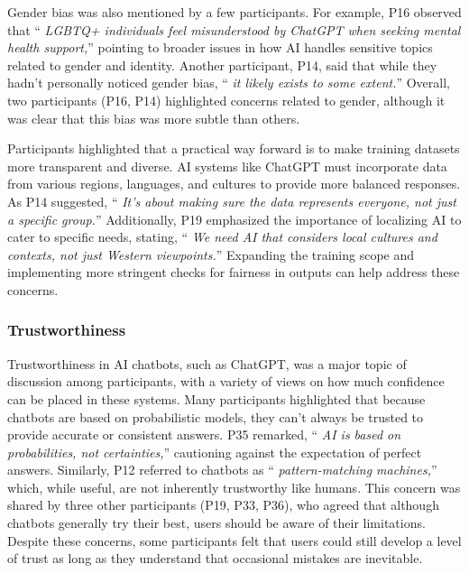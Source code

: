 \documentclass[sigconf]{acmart}
\begin{document}
Gender bias was also mentioned by a few participants. For example, P16 observed that \enquote { \emph {LGBTQ+ individuals feel misunderstood by ChatGPT when seeking mental health support,}} pointing to broader issues in how AI handles sensitive topics related to gender and identity. Another participant, P14, said that while they hadn’t personally noticed gender bias, \enquote { \emph {it likely exists to some extent.}} Overall, two participants (P16, P14) highlighted concerns related to gender, although it was clear that this bias was more subtle than others.

Participants highlighted that a practical way forward is to make training datasets more transparent and diverse. AI systems like ChatGPT must incorporate data from various regions, languages, and cultures to provide more balanced responses. As P14 suggested, \enquote { \emph {It’s about making sure the data represents everyone, not just a specific group.}} Additionally, P19 emphasized the importance of localizing AI to cater to specific needs, stating, \enquote { \emph {We need AI that considers local cultures and contexts, not just Western viewpoints.}} Expanding the training scope and implementing more stringent checks for fairness in outputs can help address these concerns.


\subsubsection{Trustworthiness}
\hfill \break

Trustworthiness in AI chatbots, such as ChatGPT, was a major topic of discussion among participants, with a variety of views on how much confidence can be placed in these systems. Many participants highlighted that because chatbots are based on probabilistic models, they can’t always be trusted to provide accurate or consistent answers. P35 remarked, \enquote { \emph {AI is based on probabilities, not certainties,}} cautioning against the expectation of perfect answers. Similarly, P12 referred to chatbots as \enquote { \emph {pattern-matching machines,}} which, while useful, are not inherently trustworthy like humans. This concern was shared by three other participants (P19, P33, P36), who agreed that although chatbots generally try their best, users should be aware of their limitations. Despite these concerns, some participants felt that users could still develop a level of trust as long as they understand that occasional mistakes are inevitable.
\end{document}
